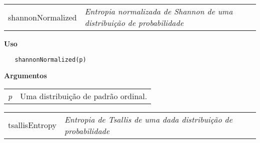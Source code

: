 \documentclass[12pt,letterpaper]{article}
\begin{document}
\newpage

\hrulefill   

\begin{table}[!h]
\begin{center}
\begin{tabularx}{\textwidth}{ X X}
\hspace{0.5cm} shannonNormalized & \textit{Entropia normalizada de Shannon de uma distribuição de probabilidade}\\
\end{tabularx}
\end{center}
\end{table} 

\vspace{-0.5cm}

\hrulefill  

\vspace{0.5cm}

\textbf{Uso}

\begin{lstlisting}
   shannonNormalized(p)
\end{lstlisting}

\vspace{0.5cm}

\textbf{Argumentos}

\begin{table}[!h]
\begin{center}
\begin{tabularx}{\textwidth}{X X}
\hspace{0.5cm} \textit{p} & Uma distribuição de padrão ordinal.\\
\end{tabularx}
\end{center}
\end{table} 

\hrulefill   

\begin{table}[!h]
\begin{center}
\begin{tabularx}{\textwidth}{ X X}
\hspace{0.5cm} tsallisEntropy & \textit{Entropia de Tsallis de uma dada distribuição de probabilidade}\\
\end{tabularx}
\end{center}
\end{table} 
\end{document}
